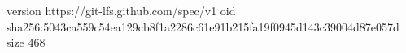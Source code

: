 version https://git-lfs.github.com/spec/v1
oid sha256:5043ca559c54ea129cb8f1a2286c61e91b215fa19f0945d143c39004d87e057d
size 468
